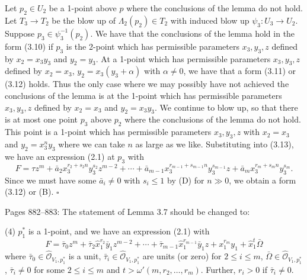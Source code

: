 \documentclass[11pt]{article}
\theoremstyle{plain}
\newcommand{\Oh}[1]{\widehat{\mathcal{O}}_{#1}}
\begin{document}
Let $p_2 \in U_2$ be a 1-point above $p$ where the conclusions of the lemma do not hold. Let $T_3 \to T_2$ be the blow up of $\Lambda_2(p_2) \in T_2$ with induced blow up $\psi_3 : U_3 \to U_2$. Suppose $p_3 \in \psi_3^{-1}(p_2)$. We have that the conclusions of the lemma hold in the form (3.10) if $p_3$ is the 2-point which has permissible parameters $x_3, y_3, z$ defined by $x_2 = x_3 y_3$ and $y_2 = y_3$. At a 1-point which has permissible parameters $x_3, y_3, z$ defined by $x_2 = x_3$, $y_2 = x_3(y_3 + \alpha)$ with $\alpha \neq 0$, we have that a form (3.11) or (3.12) holds. Thus the only case where we may possibly have not achieved the conclusions of the lemma is at the 1-point which has permissible parameters $x_3, y_3, z$ defined by $x_2 = x_3$ and $y_2 = x_3 y_3$. We continue to blow up, so that there is at most one point $p_3$ above $p_2$ where the conclusions of the lemma do not hold. This point is a 1-point which has permissible parameters $x_3, y_3, z$ with $x_2 = x_3$ and $y_2 = x_3^n y_3$ where we can take $n$ as large as we like. Substituting into (3.13), we have an expression (2.1) at $p_3$ with
\[
F = \tau z^m + \bar{a}_2 x_3^{r_2+s_2 n} y_3^{s_2} z^{m-2} + \cdots + \bar{a}_{m-1} x_3^{r_{m-1}+s_{m-1} n} y_3^{s_{m-1}} z + \bar{a}_m x_3^{r_m+s_m n} y_3^{s_m}.
\]
Since we must have some $\bar{a}_i \neq 0$ with $s_i \leqslant 1$ by (D) for $n \gg 0$, we obtain a form (3.12) or (B). \hfill $\square$

Pages 882--883: The statement of Lemma 3.7 should be changed to:




(4) $p_1^*$ is a 1-point, and we have an expression (2.1) with
\begin{equation}
F = \bar{\tau}_0 z^m + \bar{\tau}_2 \hat{x}_1^{r_2} \bar{y}_1 z^{m-2} + \cdots + \bar{\tau}_{m-1} \hat{x}_1^{r_{m-1}} \bar{y}_1 z + x_1^{r_m} y_1 + \hat{x}_1^t \bar{\Omega}
\tag{F}
\end{equation}
where $\bar{\tau}_0 \in \Oh{V_1,p_1^*}$ is a unit, $\bar{\tau}_i \in \Oh{V_1,p_1^*}$ are units (or zero) for $2 \leqslant i \leqslant m$, $\bar{\Omega} \in \Oh{V_1,p_1^*}$, $\bar{\tau}_i \neq 0$ for some $2 \leqslant i \leqslant m$ and $t > \omega'(m, r_2, \ldots, r_m)$. Further, $r_i > 0$ if $\bar{\tau}_i \neq 0$.
\end{document}
